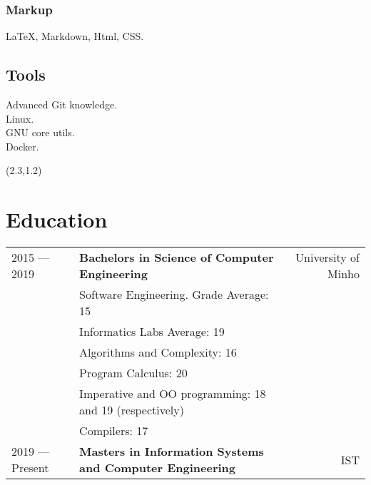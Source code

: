 \documentclass{article}
\begin{document}
\begin{textblock}{2}
\begin{flushright}
        \subsubsection{\hfill Markup}
        \LaTeX, Markdown, Html, CSS\@.
        \subsection{\hfill Tools}
        Advanced Git knowledge.\\
        Linux.\\
        GNU core utils.\\
        Docker.
    \end{flushright}
\end{textblock}
\begin{textblock}{9.4} (2.3,1.2)

    \section{Education}
    \begin{tabular}{lp{8.4cm}r}
        2015 --- 2019 & \textbf{Bachelors in Science of Computer Engineering} & University of Minho\\
        & Software Engineering. Grade Average: 15 &\\
        & Informatics Labs Average: 19 & \\
        & Algorithms and Complexity: 16 & \\
        & Program Calculus: 20 & \\
        & Imperative and OO programming: 18 and 19 (respectively) &\\
        & Compilers: 17 &\\
        2019 --- Present & \textbf{Masters in Information Systems and Computer Engineering} & IST\\
    \end{tabular}


\end{textblock}
\end{document}
